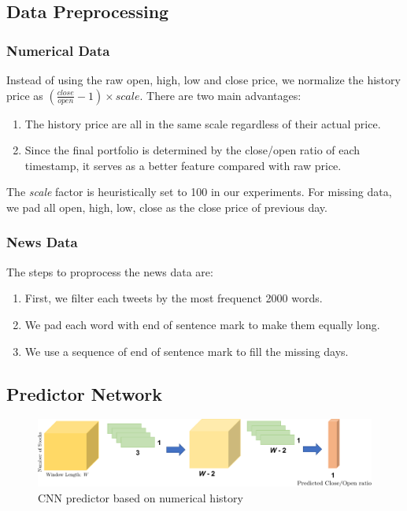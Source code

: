 \documentclass[a4paper, 10pt]{article}
\begin{document}
\begin{spacing}{1.2}
    \subsection{Data Preprocessing}
    \subsubsection{Numerical Data}
    Instead of using the raw open, high, low and close price, we normalize the history price as $(\frac{close}{open} - 1)\times scale$. There are two main advantages:
    \begin{enumerate}
      \item The history price are all in the same scale regardless of their actual price.
      \item Since the final portfolio is determined by the close/open ratio of each timestamp, it serves as a better feature compared with raw price.
    \end{enumerate}
    The \emph{scale} factor is heuristically set to 100 in our experiments. For missing data, we pad all open, high, low, close as the close price of previous day.
    \subsubsection{News Data}
    The steps to proprocess the news data are:
    \begin{enumerate}
      \item First, we filter each tweets by the most frequenct 2000 words.
      \item We pad each word with end of sentence mark to make them equally long.
      \item We use a sequence of end of sentence mark to fill the missing days.
    \end{enumerate}
    
    \subsection{Predictor Network}
    \begin{figure}
      \centering
      \includegraphics[scale=0.5]{predictor_cnn}
      \caption{CNN predictor based on numerical history}
      \label{fig:predictor_cnn}
    \end{figure}
  

\end{spacing}
\end{document}
